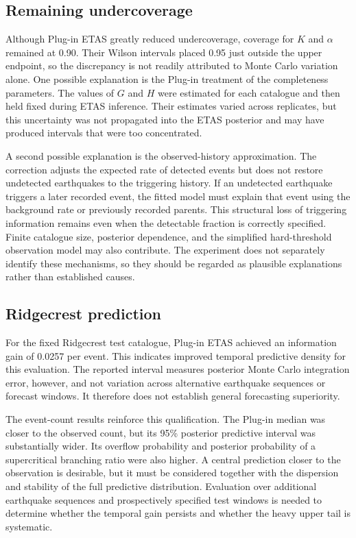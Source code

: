 \documentclass{statsmsc}
\begin{document}
\subsection{Remaining undercoverage}

Although Plug-in ETAS greatly reduced undercoverage, coverage for \(K\) and
\(\alpha\) remained at 0.90. Their Wilson intervals placed 0.95 just outside
the upper endpoint, so the discrepancy is not readily attributed to Monte
Carlo variation alone. One possible explanation is the Plug-in treatment of
the completeness parameters. The values of \(G\) and \(H\) were estimated
for each catalogue and then held fixed during ETAS inference. Their estimates
varied across replicates, but this uncertainty was not propagated into the
ETAS posterior and may have produced intervals that were too concentrated.

A second possible explanation is the observed-history approximation. The
correction adjusts the expected rate of detected events but does not restore
undetected earthquakes to the triggering history. If an undetected earthquake
triggers a later recorded event, the fitted model must explain that event using
the background rate or previously recorded parents. This structural loss of
triggering information remains even when the detectable fraction is correctly
specified. Finite catalogue size, posterior dependence, and the simplified
hard-threshold observation model may also contribute. The experiment does not
separately identify these mechanisms, so they should be regarded as plausible
explanations rather than established causes.

\subsection{Ridgecrest prediction}

For the fixed Ridgecrest test catalogue, Plug-in ETAS achieved an information
gain of 0.0257 per event. This indicates improved temporal predictive density
for this evaluation. The reported interval measures posterior Monte Carlo
integration error, however, and not variation across alternative earthquake
sequences or forecast windows. It therefore does not establish general
forecasting superiority.

The event-count results reinforce this qualification. The Plug-in median was
closer to the observed count, but its 95\% posterior predictive interval was
substantially wider. Its overflow probability and posterior probability of a
supercritical branching ratio were also higher. A central prediction closer
to the observation is desirable, but it must be considered together with the
dispersion and stability of the full predictive distribution. Evaluation over
additional earthquake sequences and prospectively specified test windows is
needed to determine whether the temporal gain persists and whether the heavy
upper tail is systematic.
\end{document}
